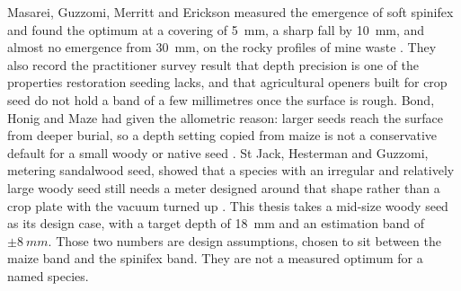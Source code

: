 Masarei, Guzzomi, Merritt and Erickson measured the emergence of soft spinifex and found the optimum at a covering of \SI{5}{mm}, a sharp fall by \SI{10}{mm}, and almost no emergence from \SI{30}{mm}, on the rocky profiles of mine waste \cite{masarei2019}. They also record the practitioner survey result that depth precision is one of the properties restoration seeding lacks, and that agricultural openers built for crop seed do not hold a band of a few millimetres once the surface is rough. Bond, Honig and Maze had given the allometric reason: larger seeds reach the surface from deeper burial, so a depth setting copied from maize is not a conservative default for a small woody or native seed \cite{bond1999}. St Jack, Hesterman and Guzzomi, metering sandalwood seed, showed that a species with an irregular and relatively large woody seed still needs a meter designed around that shape rather than a crop plate with the vacuum turned up \cite{stjack2013}. This thesis takes a mid-size woody seed as its design case, with a target depth of \SI{18}{mm} and an estimation band of \(\pm\SI{8}{mm}\). Those two numbers are design assumptions, chosen to sit between the maize band and the spinifex band. They are not a measured optimum for a named species.

